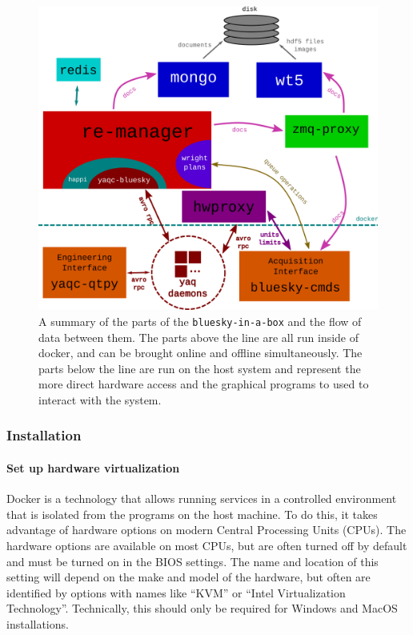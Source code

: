 \begin{figure}
\includegraphics[width=7in]{"acquisition/images/bluesky-in-a-box-architecture"}
\caption[\texttt{bluesky-in-a-box} architecture]{
A summary of the parts of the \texttt{bluesky-in-a-box} and the flow of data between them.
The parts above the line are all run inside of docker, and can be brought online and offline simultaneously.
The parts below the line are run on the host system and represent the more direct hardware access and the graphical programs to used to interact with the system.
}
\label{acq:fig:biab_arch}
\end{figure}

\subsubsection{Installation}
\label{biab-install}

\paragraph{Set up hardware virtualization}

Docker is a technology that allows running services in a controlled environment that is isolated from the programs on the host machine.
To do this, it takes advantage of hardware options on modern Central Processing Units (CPUs).
The hardware options are available on most CPUs, but are often turned off by default and must be turned on in the BIOS settings.
The name and location of this setting will depend on the make and model of the hardware, but often are identified by options with names like ``KVM'' or ``Intel Virtualization Technology''.
Technically, this should only be required for Windows and MacOS installations.

